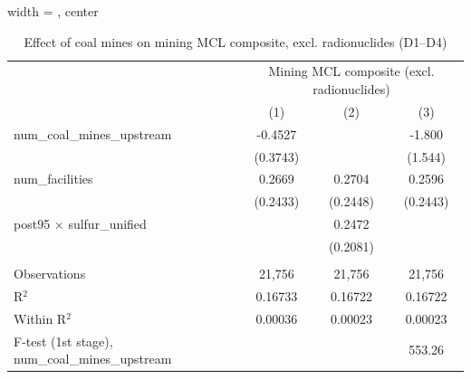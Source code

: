 
\begin{table}[htbp]
   
   \caption{\label{2sls_4step_d1_d4_mining_mcl_norad} Effect of coal mines on mining MCL composite, excl. radionuclides (D1--D4)}
   \bigskip
   
   \centering
   
   \begin{adjustbox}{width = \textwidth, center}
      
      
      \begin{tabular}{lccc}
         \toprule
         
          & \multicolumn{3}{c}{Mining MCL composite (excl. radionuclides)}\\
         
                                                           & (1)           & (2)           & (3)\\  
         
         \midrule 
         num\_coal\_mines\_upstream                        & -0.4527       &               & -1.800\\   
                                                           & (0.3743)      &               & (1.544)\\   
         num\_facilities                                   & 0.2669        & 0.2704        & 0.2596\\   
                                                           & (0.2433)      & (0.2448)      & (0.2443)\\   
         post95 $\times$ sulfur\_unified                   &               & 0.2472        &   \\   
                                                           &               & (0.2081)      &   \\   
         
          \\
         
         Observations                                      & 21,756        & 21,756        & 21,756\\  
         R$^2$                                             & 0.16733       & 0.16722       & 0.16722\\  
         Within R$^2$                                      & 0.00036       & 0.00023       & 0.00023\\  
         F-test (1st stage), num\_coal\_mines\_upstream    &               &               & 553.26\\  
         

\end{tabular}
\end{adjustbox}
\end{table}
